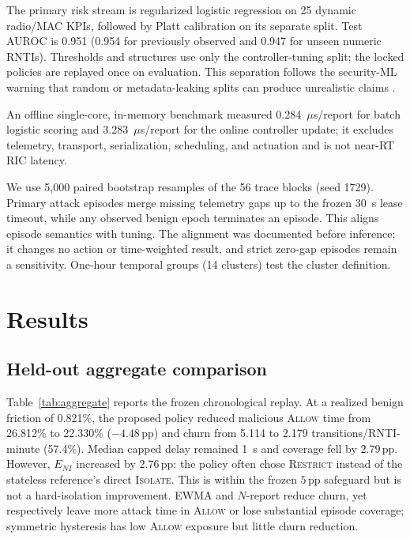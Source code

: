 \documentclass[journal,10pt]{IEEEtran}
\newcommand{\Allow}{\textsc{Allow}}
\newcommand{\Restrict}{\textsc{Restrict}}
\newcommand{\Isolate}{\textsc{Isolate}}
\newcommand{\pp}{\,\mathrm{pp}}
\begin{document}
The primary risk stream is regularized logistic regression on 25 dynamic radio/MAC KPIs, followed by Platt calibration on its separate split. Test AUROC is 0.951 (0.954 for previously observed and 0.947 for unseen numeric RNTIs). Thresholds and structures use only the controller-tuning split; the locked policies are replayed once on evaluation. This separation follows the security-ML warning that random or metadata-leaking splits can produce unrealistic claims \cite{arp2022}.

An offline single-core, in-memory benchmark measured 0.284~$\mu$s/report for batch logistic scoring and 3.283~$\mu$s/report for the online controller update; it excludes telemetry, transport, serialization, scheduling, and actuation and is not near-RT RIC latency.

We use 5,000 paired bootstrap resamples of the 56 trace blocks (seed 1729). Primary attack episodes merge missing telemetry gaps up to the frozen 30~s lease timeout, while any observed benign epoch terminates an episode. This aligns episode semantics with tuning. The alignment was documented before inference; it changes no action or time-weighted result, and strict zero-gap episodes remain a sensitivity. One-hour temporal groups (14 clusters) test the cluster definition.

\section{Results}
\subsection{Held-out aggregate comparison}
Table~\ref{tab:aggregate} reports the frozen chronological replay. At a realized benign friction of 0.821\%, the proposed policy reduced malicious \Allow{} time from 26.812\% to 22.330\% ($-4.48\pp$) and churn from 5.114 to 2.179 transitions/RNTI-minute (57.4\%). Median capped delay remained 1~s and coverage fell by $2.79\pp$. However, $E_{NI}$ increased by $2.76\pp$: the policy often chose \Restrict{} instead of the stateless reference's direct \Isolate{}. This is within the frozen $5\pp$ safeguard but is not a hard-isolation improvement. EWMA and $N$-report reduce churn, yet respectively leave more attack time in \Allow{} or lose substantial episode coverage; symmetric hysteresis has low \Allow{} exposure but little churn reduction.
\end{document}
